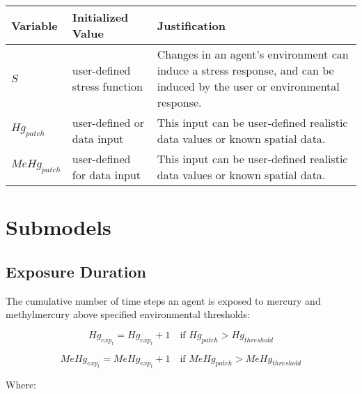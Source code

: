 \documentclass[
]{book}
\begin{document}
\begin{longtable}[]{@{}
  >{\centering\arraybackslash}p{}
  >{\centering\arraybackslash}p{}
  >{\centering\arraybackslash}p{}@{}}
\toprule\noalign{}
\begin{minipage}[b]{\linewidth}\centering
Variable
\end{minipage} & \begin{minipage}[b]{\linewidth}\centering
Initialized Value
\end{minipage} & \begin{minipage}[b]{\linewidth}\centering
Justification
\end{minipage} \\
\midrule\noalign{}
\endhead
\bottomrule\noalign{}
\endlastfoot
\(S\) & user-defined stress function & Changes in an agent's environment can induce a stress response, and can be induced by the user or environmental response. \\
\(Hg_{patch}\) & user-defined or data input & This input can be user-defined realistic data values or known spatial data. \\
\(MeHg_{patch}\) & user-defined for data input & This input can be user-defined realistic data values or known spatial data. \\
\end{longtable}

\section{Submodels}\label{submodels-1}

\subsection{Exposure Duration}\label{exposure-duration}

The cumulative number of time steps an agent is exposed to mercury and methylmercury above specified environmental thresholds:

\[
Hg_{exp_t} = Hg_{exp_t} + 1 \quad \text{if } Hg_{patch} > Hg_{threshold}
\]

\[
MeHg_{exp_t} = MeHg_{exp_t} + 1 \quad \text{if } MeHg_{patch} > MeHg_{threshold}
\]

Where:
\end{document}
